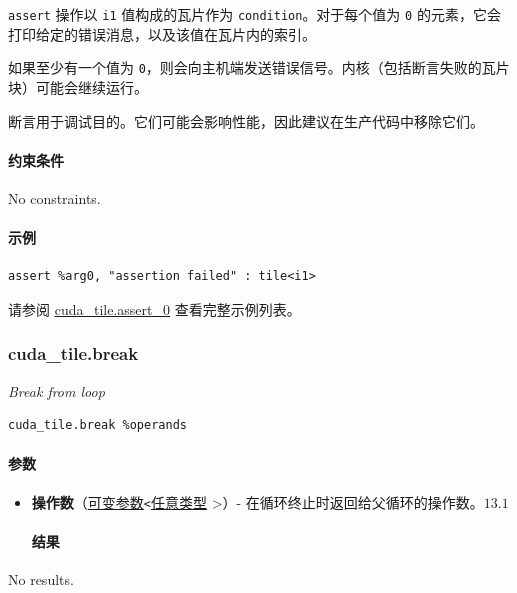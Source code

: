 \documentclass{article}
\begin{document}
\texttt{assert} 操作以 \texttt{i1} 值构成的瓦片作为 \texttt{condition}。对于每个值为 \texttt{0} 的元素，它会打印给定的错误消息，以及该值在瓦片内的索引。


如果至少有一个值为 \texttt{0}，则会向主机端发送错误信号。内核（包括断言失败的瓦片块）可能会继续运行。


断言用于调试目的。它们可能会影响性能，因此建议在生产代码中移除它们。



\paragraph{约束条件}

No constraints.



\paragraph{示例}

\begin{lstlisting}
assert %arg0, "assertion failed" : tile<i1>
\end{lstlisting}

请参阅 \href{https://docs.nvidia.com/cuda/tile-ir/latest/sections/appendix.html#example-cuda-tile-assert-0}{cuda\_tile.assert\_0} 查看完整示例列表。



\subsubsection{cuda\_tile.break}

\textit{Break from loop}


\begin{lstlisting}
cuda_tile.break %operands
\end{lstlisting}

\paragraph{参数}

\begin{itemize}
\item \textbf{操作数}（\href{https://docs.nvidia.com/cuda/tile-ir/latest/sections/operations.html#type-variadic}{可变参数}\texttt{<}\href{https://docs.nvidia.com/cuda/tile-ir/latest/sections/operations.html#type-any}{任意类型} >）- 在循环终止时返回给父循环的操作数。$\boxed{13.1}$


\paragraph{结果}

\end{itemize}
No results.
\end{document}
